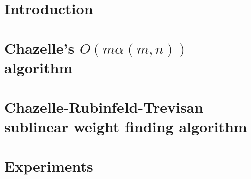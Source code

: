 \documentclass{report}
\theoremstyle{definition}
\begin{document}


\pagebreak
\tableofcontents

\pagebreak

\chapter{Introduction}


\chapter{Chazelle's \boldmath $O(m\alpha(m,n))$ algorithm}


\chapter {Chazelle-Rubinfeld-Trevisan sublinear weight finding algorithm}


\chapter{Experiments}


\printbibliography
\end{document}
